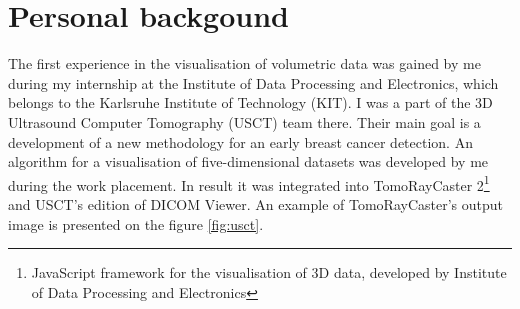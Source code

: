 \documentclass[twoside, english, 11pt]{report}
\begin{document}
\section{Personal backgound}

The first experience in the visualisation of volumetric data was gained by me during my internship at the Institute of Data Processing and Electronics, which belongs to the Karlsruhe Institute of Technology (KIT). I was a part of the 3D Ultrasound Computer Tomography (USCT) team there. Their main goal is a development of a new methodology for an early breast cancer detection. An algorithm for a visualisation of five-dimensional datasets was developed by me during the work placement. In result it was integrated into TomoRayCaster 2\footnote{JavaScript framework for the visualisation of 3D data, developed by Institute of Data Processing and Electronics} and USCT's edition of DICOM Viewer. An example of TomoRayCaster's output image is presented on the figure \ref{fig:usct}.\\
\end{document}
